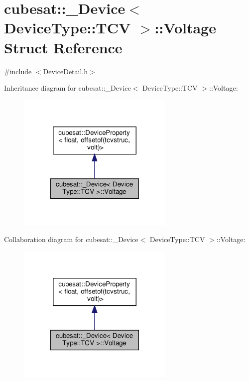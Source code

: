 \hypertarget{structcubesat_1_1__Device_3_01DeviceType_1_1TCV_01_4_1_1Voltage}{}\section{cubesat\+:\+:\+\_\+\+Device$<$ Device\+Type\+:\+:T\+CV $>$\+:\+:Voltage Struct Reference}
\label{structcubesat_1_1__Device_3_01DeviceType_1_1TCV_01_4_1_1Voltage}


{\ttfamily \#include $<$Device\+Detail.\+h$>$}



Inheritance diagram for cubesat\+:\+:\+\_\+\+Device$<$ Device\+Type\+:\+:T\+CV $>$\+:\+:Voltage\+:\nopagebreak
\begin{figure}[H]
\begin{center}
\leavevmode
\includegraphics[width=213pt]{structcubesat_1_1__Device_3_01DeviceType_1_1TCV_01_4_1_1Voltage__inherit__graph}
\end{center}
\end{figure}


Collaboration diagram for cubesat\+:\+:\+\_\+\+Device$<$ Device\+Type\+:\+:T\+CV $>$\+:\+:Voltage\+:\nopagebreak
\begin{figure}[H]
\begin{center}
\leavevmode
\includegraphics[width=213pt]{structcubesat_1_1__Device_3_01DeviceType_1_1TCV_01_4_1_1Voltage__coll__graph}
\end{center}
\end{figure}

